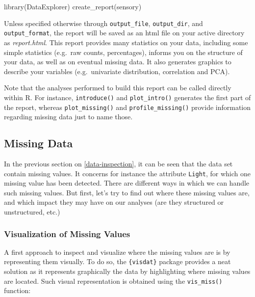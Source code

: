 \documentclass[
]{krantz}
\makeatletter
\newenvironment{Shaded}{\begin{snugshade}}{\end{snugshade}}
\newcommand{\FunctionTok}[1]{\textcolor[rgb]{0,0,0}{#1}}
\newcommand{\NormalTok}[1]{#1}
\renewenvironment{quote}{\begin{VF}}{\end{VF}}
\newenvironment{kframe}{%
\medskip{}
\setlength{\fboxsep}{.8em}
 \def\at@end@of@kframe{}%
 \ifinner\ifhmode%
  \def\at@end@of@kframe{\end{minipage}}%
  \begin{minipage}{\columnwidth}%
 \fi\fi%
 \def\FrameCommand##1{\hskip\@totalleftmargin \hskip-\fboxsep
 \colorbox{shadecolor}{##1}\hskip-\fboxsep
     \hskip-\linewidth \hskip-\@totalleftmargin \hskip\columnwidth}%
 \MakeFramed {\advance\hsize-\width
   \@totalleftmargin\z@ \linewidth\hsize
   \@setminipage}}%
 {\par\unskip\endMakeFramed%
 \at@end@of@kframe}
\renewenvironment{Shaded}{\begin{kframe}}{\end{kframe}}
\makeatother
\begin{document}
\begin{Shaded}
\begin{Highlighting}[]
\FunctionTok{library}\NormalTok{(DataExplorer)}
\FunctionTok{create\_report}\NormalTok{(sensory)}
\end{Highlighting}
\end{Shaded}

Unless specified otherwise through \texttt{output\_file}, \texttt{output\_dir}, and \texttt{output\_format}, the report will be saved as an html file on your active directory as \emph{report.html}. This report provides many statistics on your data, including some simple statistics (e.g.~raw counts, percentages), informs you on the structure of your data, as well as on eventual missing data. It also generates graphics to describe your variables (e.g.~univariate distribution, correlation and PCA).

\begin{quote}
Note that the analyses performed to build this report can be called directly within R. For instance, \texttt{introduce()} and \texttt{plot\_intro()} generates the first part of the report, whereas \texttt{plot\_missing()} and \texttt{profile\_missing()} provide information regarding missing data just to name those.
\end{quote}

\hypertarget{missing-data}{%
\subsection{Missing Data}\label{missing-data}}

In the previous section on \ref{data-inspection}, it can be seen that the data set contain missing values. It concerns for instance the attribute \texttt{Light}, for which one missing value has been detected. There are different ways in which we can handle such missing values. But first, let's try to find out where these missing values are, and which impact they may have on our analyses (are they structured or unstructured, etc.)

\hypertarget{visualization-of-missing-values}{%
\subsubsection{Visualization of Missing Values}\label{visualization-of-missing-values}}

A first approach to inspect and visualize where the missing values are is by representing them visually. To do so, the \texttt{\{visdat\}} package provides a neat solution as it represents graphically the data by highlighting where missing values are located. Such visual representation is obtained using the \texttt{vis\_miss()} function:
\end{document}
